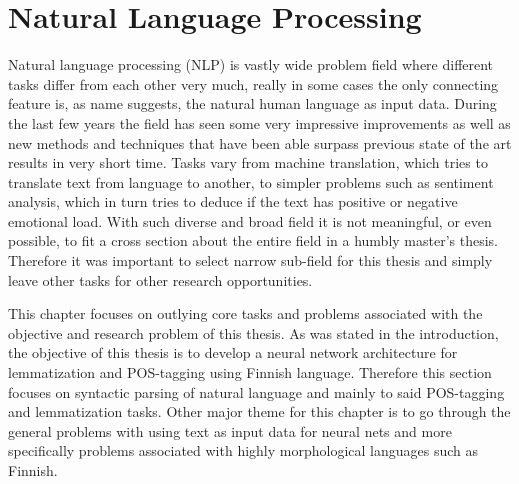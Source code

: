 \documentclass[12pt,a4paper,english
]{tutthesis}
\begin{document}
\chapter{Natural Language Processing}
\label{ch:natural_language_processing}
Natural language processing (NLP) is vastly wide problem field where different tasks differ from each other very much, really in some cases the only connecting feature is, as name suggests, the natural human language as input data. During the last few years the field has seen some very impressive improvements as well as new methods and techniques that have been able surpass previous state of the art results in very short time. Tasks vary from machine translation, which tries to translate text from language to another, to simpler problems such as sentiment analysis, which in turn tries to deduce if the text has positive or negative emotional load. With such diverse and broad field it is not meaningful, or even possible, to fit a cross section about the entire field in a humbly master's thesis. Therefore it was important to select narrow sub-field for this thesis and simply leave other tasks for other research opportunities.

This chapter focuses on outlying core tasks and problems associated with the objective and research problem of this thesis. As was stated in the introduction, the objective of this thesis is to develop a neural network architecture for lemmatization and POS-tagging using Finnish language. Therefore this section focuses on syntactic parsing of natural language and mainly to said POS-tagging and lemmatization tasks. Other major theme for this chapter is to go through the general problems with using text as input data for neural nets and more specifically problems associated with highly morphological languages such as Finnish.
\end{document}
